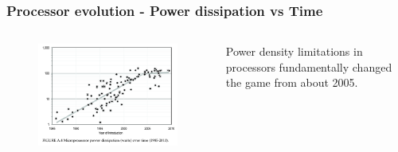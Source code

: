 \begin{frame}
\frametitle{Processor evolution - Power dissipation vs Time}

\begin{columns}[T] %

\begin{column}{.48\textwidth}
\begin{figure}[htbp]
\begin{center}
\includegraphics[width=1.0\textwidth]{images/moore1.png}
\end{center}
\end{figure}
\end{column}%

\hfill%

\begin{column}{.48\textwidth}
\small{Power density limitations in processors fundamentally changed the game from about 2005.}
\end{column}%

\end{columns}


\end{frame}



